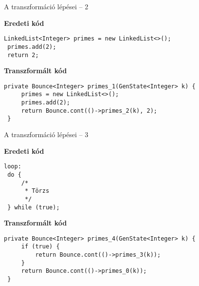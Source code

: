 \begin{frame}[fragile]{A transzformáció lépései -- 2}
\begin{center}\textbf{Eredeti kód}\end{center}
\begin{lstlisting}[linebackgroundcolor={
            \btLstHL<1>{30} % No highlighting
            \btLstHL<2>{1}
            \btLstHL<3>{3}
        }]
 LinkedList<Integer> primes = new LinkedList<>();
 primes.add(2);
 return 2;
\end{lstlisting}

\begin{center}\textbf{Transzformált kód}\end{center}
\begin{lstlisting}[linebackgroundcolor={
            \btLstHL<1>{30} % No highlighting
            \btLstHL<2>{2}
            \btLstHL<3>{4}
        }]
 private Bounce<Integer> primes_1(GenState<Integer> k) {
     primes = new LinkedList<>();
     primes.add(2);
     return Bounce.cont(()->primes_2(k), 2);
 }
\end{lstlisting}
\end{frame}


\begin{frame}[fragile]{A transzformáció lépései -- 3}
\begin{center}\textbf{Eredeti kód}\end{center}
\begin{lstlisting}[linebackgroundcolor={
            \btLstHL<1>{30} % No highlighting
            \btLstHL<2>{6}
            \btLstHL<3>{30} % No highlighting
            \btLstHL<4>{30} % No highlighting
        }]
 loop:
 do {
     /*
      * Törzs
      */
 } while (true);
\end{lstlisting}

\begin{center}\textbf{Transzformált kód}\end{center}
\begin{lstlisting}[linebackgroundcolor={
            \btLstHL<1>{30} % No highlighting
            \btLstHL<2>{2}
            \btLstHL<3>{3}
            \btLstHL<4>{5}
        }]
 private Bounce<Integer> primes_4(GenState<Integer> k) {
     if (true) {
         return Bounce.cont(()->primes_3(k));
     }
     return Bounce.cont(()->primes_0(k));
 }
\end{lstlisting}
\end{frame}


